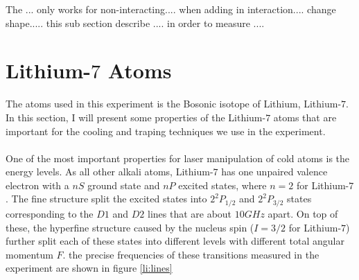 The ... only works for non-interacting.... when adding in interaction.... change shape..... this sub section describe .... in order to measure ....

\section{Lithium-$7$ Atoms}

The atoms used in this experiment is the Bosonic isotope of Lithium, Lithium-$7$. In this section, I will present some properties of the Lithium-$7$ atoms that are important for the cooling and traping techniques we use in the experiment.\\
\\
One of the most important properties for laser manipulation of cold atoms is the energy levels. As all other alkali atoms, Lithium-$7$ has one unpaired valence electron with a $nS$ ground state and $nP$ excited states, where $n=2$ for Lithium-$7$. The fine structure split the excited states into $2^2P_{1/2}$ and $2^2P_{3/2}$ states corresponding to the $D1$ and $D2$ lines that are about $10GHz$ apart. On top of these, the hyperfine structure caused by the nucleus spin ($I=3/2$ for Lithium-$7$) further split each of these states into different levels with different total angular momentum $F$. the precise frequencies of these transitions measured in the experiment are shown in figure \ref{li:lines}\\
